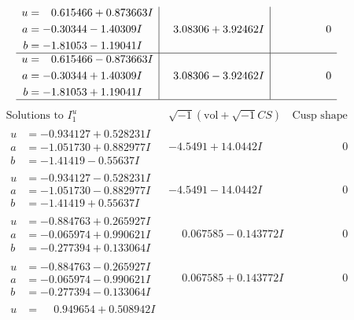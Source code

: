 \documentclass[1p]{elsarticle_modified}
\theoremstyle{definition}
\newcommand{\I}{\sqrt{-1}}
\begin{document}
$$\begin{array}{c|c|c}
\begin{aligned}
u &= \phantom{-}0.615466 + 0.873663 I \\
a &= -0.30344 - 1.40309 I \\
b &= -1.81053 - 1.19041 I\end{aligned}
 & \phantom{-}3.08306 + 3.92462 I & \phantom{-0.000000 } 0 \\ \hline\begin{aligned}
u &= \phantom{-}0.615466 - 0.873663 I \\
a &= -0.30344 + 1.40309 I \\
b &= -1.81053 + 1.19041 I\end{aligned}
 & \phantom{-}3.08306 - 3.92462 I & \phantom{-0.000000 } 0\\
 \hline 
 \end{array}$$\newpage$$\begin{array}{c|c|c}  
\text{Solutions to }I^u_{1}& \I (\text{vol} + \sqrt{-1}CS) & \text{Cusp shape}\\
 \hline 
\begin{aligned}
u &= -0.934127 + 0.528231 I \\
a &= -1.051730 + 0.882977 I \\
b &= -1.41419 - 0.55637 I\end{aligned}
 & -4.5491 + 14.0442 I & \phantom{-0.000000 } 0 \\ \hline\begin{aligned}
u &= -0.934127 - 0.528231 I \\
a &= -1.051730 - 0.882977 I \\
b &= -1.41419 + 0.55637 I\end{aligned}
 & -4.5491 - 14.0442 I & \phantom{-0.000000 } 0 \\ \hline\begin{aligned}
u &= -0.884763 + 0.265927 I \\
a &= -0.065974 + 0.990621 I \\
b &= -0.277394 + 0.133064 I\end{aligned}
 & \phantom{-}0.067585 - 0.143772 I & \phantom{-0.000000 } 0 \\ \hline\begin{aligned}
u &= -0.884763 - 0.265927 I \\
a &= -0.065974 - 0.990621 I \\
b &= -0.277394 - 0.133064 I\end{aligned}
 & \phantom{-}0.067585 + 0.143772 I & \phantom{-0.000000 } 0 \\ \hline\begin{aligned}
u &= \phantom{-}0.949654 + 0.508942 I \\

\end{aligned}
\end{array}$$
\end{document}
